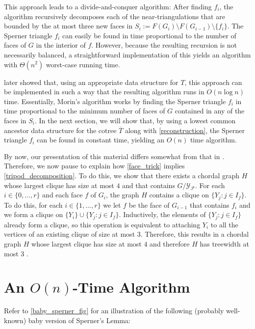 \documentclass{patmorin}
\begin{document}
This approach leads to a divide-and-conquer algorithm: After finding $f_i$, the algorithm recursively decomposes each of the near-triangulations that are bounded by the at most three new faces in $S_i:=F(G_i)\setminus F(G_{i-1})\setminus \{f_i\}$.  The Sperner triangle $f_i$ can easily be found in time proportional to the number of faces of $G$ in the interior of $f$.  However, because the resulting recursion is not necessarily balanced, a straightforward implementation of this yields an algorithm with $\Theta(n^2)$ worst-case running time.

\citet{morin:fast} later showed that, using an appropriate data structure for $T$, this approach can be implemented in such a way that the resulting algorithm runs in $O(n\log n)$ time.  Essentially, Morin's algorithm works by finding the Sperner triangle $f_i$ in time proportional to the minimum number of faces of $G$ contained in any of the faces in $S_i$.  In the next section, we will show that, by using a lowest common ancestor data structure for the cotree $\overline{T}$ along with \cref{reconstruction}, the Sperner triangle $f_i$ can be found in constant time, yielding an $O(n)$ time algorithm.

By now, our presentation of this material differs somewhat from that in \cite{dujmovic.joret.ea:planar,ueckerdt.wood.ea:improved}.  Therefore, we now pause to explain how \cref{face_trick} implies \cref{tripod_decomposition}.  To do this, we show that there exists a chordal graph $H$ whose largest clique has size at most $4$ and that contains $G/\mathcal{Y_F}$. For each $i\in\{0,\ldots,r\}$ and each face $f$ of $G_i$, the graph $H$ contains a clique on $\{Y_j:j\in I_f\}$.  To do this, for each $i\in\{1,\ldots,r\}$ we let $f$ be the face of $G_{i-1}$ that contains $f_i$ and we form a clique on $\{Y_i\}\cup\{Y_j:j\in I_f\}$.  Inductively, the elements of $\{Y_j:j\in I_f\}$ already form a clique, so this operation is equivalent to attaching $Y_i$ to all the vertices of an existing clique of size at most $3$. Therefore, this results in a chordal graph $H$ whose largest clique has size at most $4$ and therefore $H$ has treewidth at most $3$ \cite{gavril:intersection}.

\section{An $O(n)$-Time Algorithm}
\label{linear_time_algorithm}\label{algorithm}

Refer to \cref{baby_sperner_fig} for an illustration of the following (probably well-known) baby version of Sperner's Lemma:
\end{document}
